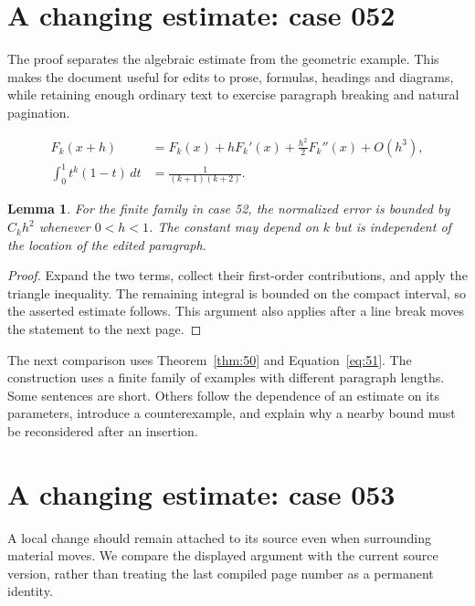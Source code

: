 \documentclass[a4paper,10pt]{article}
\newtheorem{lemma}[theorem]{Lemma}
\begin{document}
\lipsum[3]

\section{A changing estimate: case 052}\label{unit:51}
The proof separates the algebraic estimate from the geometric example. This makes the document useful for edits to prose, formulas, headings and diagrams, while retaining enough ordinary text to exercise paragraph breaking and natural pagination.

\lipsum[4-5]
\begin{align}\label{eq:51}
 F_k(x+h)&=F_k(x)+hF_k'(x)+\frac{h^2}{2}F_k''(x)+O(h^3),\\
 \int_0^1 t^k(1-t)\,dt&=\frac{1}{(k+1)(k+2)}.
\end{align}
\begin{lemma}\label{thm:51}
For the finite family in case 52, the normalized error is bounded by $C_k h^2$ whenever $0<h<1$. The constant may depend on $k$ but is independent of the location of the edited paragraph.
\end{lemma}
\begin{proof}
Expand the two terms, collect their first-order contributions, and apply the
triangle inequality. The remaining integral is bounded on the compact interval,
so the asserted estimate follows. This argument also applies after a line break
moves the statement to the next page.
\end{proof}
\begin{center}
\end{center}
The next comparison uses Theorem~\ref{thm:50} and Equation~\ref{eq:51}. The construction uses a finite family of examples with different paragraph lengths. Some sentences are short. Others follow the dependence of an estimate on its parameters, introduce a counterexample, and explain why a nearby bound must be reconsidered after an insertion.

\lipsum[8]

\section{A changing estimate: case 053}\label{unit:52}
A local change should remain attached to its source even when surrounding material moves. We compare the displayed argument with the current source version, rather than treating the last compiled page number as a permanent identity.
\end{document}
